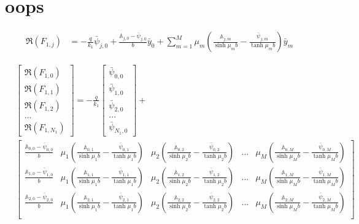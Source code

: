 \section{oops}

\begin{align}
\Re(F_{1,j})
& =
-\frac{q}{k_1}\bar{\psi}_{j,0} + \frac{\mathbb{A}_{j,0} - \bar{\psi}_{j,0}}{b} \bar{y}_0 + \sum_{m=1}^M \mu_m \left(\frac{\mathbb{A}_{j,m}}{\sinh\mu_m b} - \frac{\bar{\psi}_{j, m}}{\tanh\mu_m b}\right)\bar{y}_m
\end{align}

\begin{align}
& \begin{bmatrix}
\scriptstyle\Re(F_{1,0}) \\ \scriptstyle\Re(F_{1,1}) \\ \scriptstyle\Re(F_{1,2}) \\ ... \\ \scriptstyle\Re(F_{1,N_1})
\end{bmatrix}
 = -\frac{q}{k_1}\begin{bmatrix}
\scriptstyle\bar{\psi}_{0,0} \\ \scriptstyle\bar{\psi}_{1,0} \\ \scriptstyle\bar{\psi}_{2,0} \\ ... \\ \scriptstyle\bar{\psi}_{N_1,0}
\end{bmatrix}
+ \nonumber \\
&
\begin{bmatrix}
\frac{\mathbb{A}_{0,0} - \bar{\psi}_{0,0}}{b} & \scriptstyle\mu_1 \left(\frac{\mathbb{A}_{0,1}}{\sinh\mu_1 b} - \frac{\bar{\psi}_{0, 1}}{\tanh\mu_1 b}\right) & \scriptstyle\mu_2 \left(\frac{\mathbb{A}_{0,2}}{\sinh\mu_2 b} - \frac{\bar{\psi}_{0, 2}}{\tanh\mu_2 b}\right) & ... & \scriptstyle\mu_M \left(\frac{\mathbb{A}_{0,M}}{\sinh\mu_M b} - \frac{\bar{\psi}_{0, M}}{\tanh\mu_M b}\right) \\
%
\frac{\mathbb{A}_{1,0} - \bar{\psi}_{1,0}}{b} & \scriptstyle\mu_1 \left(\frac{\mathbb{A}_{1,1}}{\sinh\mu_1 b} - \frac{\bar{\psi}_{1, 1}}{\tanh\mu_1 b}\right) & \scriptstyle\mu_2 \left(\frac{\mathbb{A}_{1,2}}{\sinh\mu_2 b} - \frac{\bar{\psi}_{1, 2}}{\tanh\mu_2 b}\right) & ... & \scriptstyle\mu_M \left(\frac{\mathbb{A}_{1,M}}{\sinh\mu_M b} - \frac{\bar{\psi}_{1, M}}{\tanh\mu_M b}\right) \\
%
\frac{\mathbb{A}_{2,0} - \bar{\psi}_{2,0}}{b} & \scriptstyle\mu_1 \left(\frac{\mathbb{A}_{2,1}}{\sinh\mu_1 b} - \frac{\bar{\psi}_{2, 1}}{\tanh\mu_1 b}\right) & \scriptstyle\mu_2 \left(\frac{\mathbb{A}_{2,2}}{\sinh\mu_2 b} - \frac{\bar{\psi}_{2, 2}}{\tanh\mu_2 b}\right) & ... & \scriptstyle\mu_M \left(\frac{\mathbb{A}_{2,M}}{\sinh\mu_M b} - \frac{\bar{\psi}_{2, M}}{\tanh\mu_M b}\right) \\

\end{bmatrix}
\end{align}
